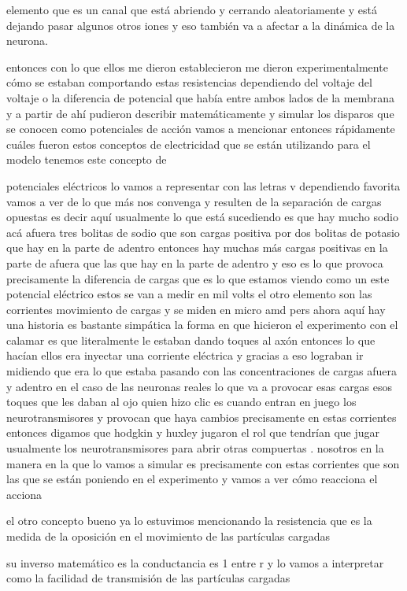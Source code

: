  elemento que es un canal que está abriendo y cerrando aleatoriamente y está dejando pasar algunos otros iones y eso también va a afectar a la dinámica de la neurona.

entonces con lo que ellos me dieron establecieron me dieron experimentalmente cómo se estaban comportando estas resistencias dependiendo del voltaje del voltaje o la diferencia de potencial que había entre ambos lados de la membrana y a partir de ahí pudieron describir matemáticamente y simular los disparos que se conocen como potenciales de acción 
vamos a mencionar entonces rápidamente cuáles fueron estos conceptos de electricidad que se están utilizando para el modelo tenemos este concepto de 


potenciales eléctricos lo vamos a representar con las letras v dependiendo favorita vamos a ver de lo que más nos convenga y resulten de la separación de cargas opuestas es decir aquí usualmente lo que está sucediendo es que hay mucho sodio acá afuera tres bolitas de sodio que son cargas positiva por dos bolitas de potasio que hay en la parte de adentro entonces hay muchas más cargas positivas en la parte de afuera que las que hay en la parte de adentro y eso es lo que provoca precisamente la diferencia de cargas que es lo que estamos viendo como un este potencial eléctrico estos se van a medir en mil volts el otro elemento son las corrientes movimiento de cargas y se miden en micro amd pers ahora aquí hay una historia es bastante simpática la forma en que hicieron el experimento con el calamar es que literalmente le estaban dando toques al axón entonces lo que hacían ellos era inyectar una corriente eléctrica y gracias a eso lograban ir midiendo que era lo que estaba pasando con las concentraciones de cargas afuera y adentro en el caso de las neuronas reales lo que va a provocar esas cargas esos toques que les daban al ojo quien hizo clic es cuando entran en juego los neurotransmisores y provocan que haya cambios precisamente en estas corrientes entonces digamos que hodgkin y huxley  jugaron el rol que tendrían que jugar usualmente los neurotransmisores para abrir otras compuertas . nosotros en la manera en la que lo vamos a simular es precisamente con estas corrientes que son las que se están poniendo en el experimento y vamos a ver cómo reacciona el acciona 

el otro concepto bueno ya lo estuvimos mencionando la resistencia que es la medida de la oposición en el movimiento de las partículas cargadas 

su inverso matemático es la conductancia es 1 entre r y lo vamos a interpretar como la facilidad de transmisión de las partículas cargadas 


